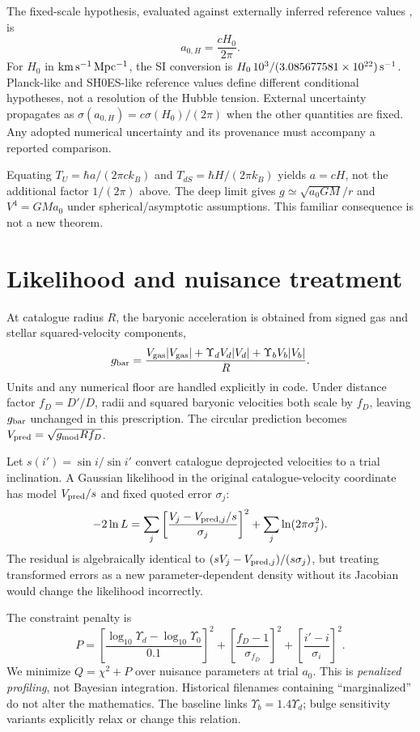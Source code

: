 \documentclass[11pt]{article}
\begin{document}
The fixed-scale hypothesis, evaluated against externally inferred reference values
\cite{planck2018,riess2022}, is
\begin{equation} a_{0,H}=\frac{cH_0}{2\pi}. \end{equation}
For $H_0$ in ${\rm km\,s^{-1}\,Mpc^{-1}}$, the SI conversion is $H_0\,10^3/(3.085677581\times10^{22})\,{\rm s^{-1}}$. Planck-like and SH0ES-like reference values define different conditional hypotheses, not a resolution of the Hubble tension. External uncertainty propagates as $\sigma(a_{0,H})=c\sigma(H_0)/(2\pi)$ when the other quantities are fixed. Any adopted numerical uncertainty and its provenance must accompany a reported comparison.

Equating $T_U=\hbar a/(2\pi c k_B)$ and $T_{dS}=\hbar H/(2\pi k_B)$ yields $a=cH$, not the additional factor $1/(2\pi)$ above. The deep limit gives $g\simeq\sqrt{a_0GM}/r$ and $V^4=GMa_0$ under spherical/asymptotic assumptions. This familiar consequence is not a new theorem.

\section{Likelihood and nuisance treatment}
At catalogue radius $R$, the baryonic acceleration is obtained from signed gas and stellar squared-velocity components,
\begin{equation}
g_{\rm bar}=\frac{V_{\rm gas}|V_{\rm gas}|+\Upsilon_d V_d|V_d|+\Upsilon_b V_b|V_b|}{R}.
\end{equation}
Units and any numerical floor are handled explicitly in code. Under distance factor $f_D=D'/D$, radii and squared baryonic velocities both scale by $f_D$, leaving $g_{\rm bar}$ unchanged in this prescription. The circular prediction becomes $V_{\rm pred}=\sqrt{g_{\rm mod}R f_D}$.

Let $s(i')=\sin i/\sin i'$ convert catalogue deprojected velocities to a trial inclination. A Gaussian likelihood in the original catalogue-velocity coordinate has model $V_{\rm pred}/s$ and fixed quoted error $\sigma_j$:
\begin{equation}
-2\ln L=\sum_j\left[\frac{V_j-V_{{\rm pred},j}/s}{\sigma_j}\right]^2+\sum_j\ln(2\pi\sigma_j^2).
\end{equation}
The residual is algebraically identical to $(sV_j-V_{{\rm pred},j})/(s\sigma_j)$, but treating transformed errors as a new parameter-dependent density without its Jacobian would change the likelihood incorrectly.

The constraint penalty is
\begin{equation}
P=\left[\frac{\log_{10}\Upsilon_d-\log_{10}\Upsilon_0}{0.1}\right]^2+
\left[\frac{f_D-1}{\sigma_{f_D}}\right]^2+
\left[\frac{i'-i}{\sigma_i}\right]^2.
\end{equation}
We minimize $Q=\chi^2+P$ over nuisance parameters at trial $a_0$. This is \emph{penalized profiling}, not Bayesian integration. Historical filenames containing ``marginalized'' do not alter the mathematics. The baseline links $\Upsilon_b=1.4\Upsilon_d$; bulge sensitivity variants explicitly relax or change this relation.
\end{document}

